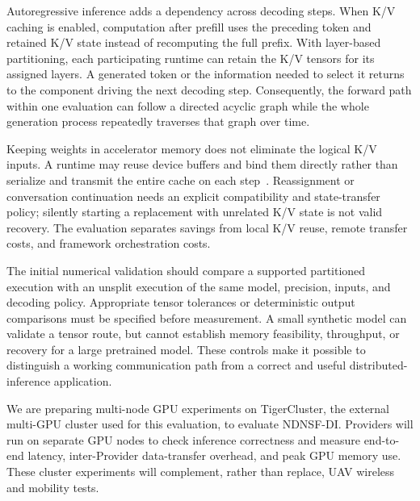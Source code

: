 Autoregressive inference adds a dependency across decoding steps. When K/V caching is enabled, computation after prefill uses the preceding token and retained K/V state instead of recomputing the full prefix. With layer-based partitioning, each participating runtime can retain the K/V tensors for its assigned layers. A generated token or the information needed to select it returns to the component driving the next decoding step. Consequently, the forward path within one evaluation can follow a directed acyclic graph while the whole generation process repeatedly traverses that graph over time.

Keeping weights in accelerator memory does not eliminate the logical K/V inputs. A runtime may reuse device buffers and bind them directly rather than serialize and transmit the entire cache on each step~\cite{ortkvcache}. Reassignment or conversation continuation needs an explicit compatibility and state-transfer policy; silently starting a replacement with unrelated K/V state is not valid recovery. The evaluation separates savings from local K/V reuse, remote transfer costs, and framework orchestration costs.

The initial numerical validation should compare a supported partitioned execution with an unsplit execution of the same model, precision, inputs, and decoding policy. Appropriate tensor tolerances or deterministic output comparisons must be specified before measurement. A small synthetic model can validate a tensor route, but cannot establish memory feasibility, throughput, or recovery for a large pretrained model. These controls make it possible to distinguish a working communication path from a correct and useful distributed-inference application.

We are preparing multi-node GPU experiments on TigerCluster, the external multi-GPU cluster used for this evaluation, to evaluate NDNSF-DI. Providers will run on separate GPU nodes to check inference correctness and measure end-to-end latency, inter-Provider data-transfer overhead, and peak GPU memory use. These cluster experiments will complement, rather than replace, UAV wireless and mobility tests.
